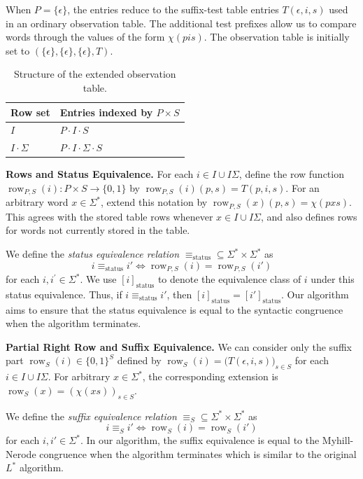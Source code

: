 \documentclass{ieice-tecrep}
\begin{document}
When \(P=\{\epsilon\}\), the entries reduce
to the suffix-test table entries \(T(\epsilon,i,s)\) used in an ordinary
observation table. The additional test prefixes allow us to compare
words through the values of the form \(\chi(pis)\). The observation table is initially set to \((\{\epsilon\},\{\epsilon\},\{\epsilon\},T)\).

\begin{table}[!ht]
\centering
\caption{Structure of the extended observation table.}
\label{tab:observation-table}
\begin{tabular}{@{}ll@{}}
\toprule
Row set & Entries indexed by \(P \times S\) \\
\midrule
\(I\) & \(P \cdot I \cdot S\) \\
\(I \cdot \Sigma\) & \(P \cdot I \cdot \Sigma \cdot S\) \\
\bottomrule
\end{tabular}
\end{table}

\textbf{Rows and Status Equivalence.}
For each \(i\in I\cup I\Sigma\), define the row function
\(\operatorname{row}_{P,S}(i):P\times S\to\{0,1\}\) by
\(\operatorname{row}_{P,S}(i)(p,s)=T(p,i,s)\).
For an arbitrary word \(x\in\Sigma^*\), extend this notation by
\(\operatorname{row}_{P,S}(x)(p,s)=\chi(pxs)\). This agrees with the
stored table rows whenever \(x\in I\cup I\Sigma\), and also
defines rows for words not currently stored in the table.

We define the \emph{status equivalence relation} \(\equiv_{\mathrm{status}} \subseteq \Sigma^* \times \Sigma^*\) as
\[
i \equiv_{\mathrm{status}} i'
\Longleftrightarrow
\operatorname{row}_{P,S}(i)=\operatorname{row}_{P,S}(i')
\]
for each \(i,i^{\prime} \in \Sigma^*\).
We use \([i]_{\mathrm{status}}\) to denote the equivalence class of
\(i\) under this status equivalence. Thus, if \(i \equiv_{\mathrm{status}} i'\), then \([i]_{\mathrm{status}} = [i']_{\mathrm{status}}\).
Our algorithm aims to ensure that the status equivalence is equal to the syntactic congruence when the algorithm terminates.

\textbf{Partial Right Row and Suffix Equivalence.}
We can consider only the suffix part
\(
\operatorname{row}_{S}(i) \in \{0,1\}^{S}
\)
defined by
\(
\operatorname{row}_{S}(i) = \bigl(T(\epsilon,i,s)\bigr)_{s\in S}
\)
for each \(i \in I\cup I\Sigma\).
For arbitrary \(x\in\Sigma^*\), the corresponding extension is
\(\operatorname{row}_S(x)=(\chi(xs))_{s\in S}\).

We define the \emph{suffix equivalence relation} \(\equiv_{S} \subseteq \Sigma^* \times \Sigma^*\) as
\[
i \equiv_{S} i'
\Longleftrightarrow
\operatorname{row}_{S}(i)=\operatorname{row}_{S}(i')
\]
for each \(i,i' \in \Sigma^*\). In our algorithm,
the suffix equivalence is equal to the Myhill-Nerode congruence when the algorithm terminates
which is similar to the original \(L^*\) algorithm.
\end{document}
